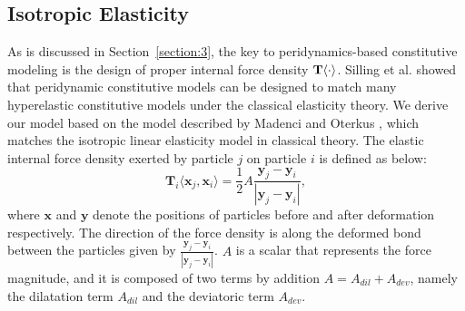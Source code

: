 \subsection{Isotropic Elasticity}\label{section:4.1}

As is discussed in Section~\ref{section:3}, the key to peridynamics-based constitutive modeling is the design of proper internal force density $\nobreak{\mathbf{T}\langle\cdot\rangle}$. Silling et al.\cite{silling2007peridynamic} showed that peridynamic constitutive models can be designed to match many hyperelastic constitutive models under the classical elasticity theory. We derive our model based on the model described by Madenci and Oterkus \cite{madenci2014peridynamic}, which matches the isotropic linear elasticity model in classical theory. The elastic internal force density exerted by particle $j$ on particle $i$ is defined as below:
\begin{equation}
\mathbf{T}_i\langle\mathbf{x}_j,\mathbf{x}_i\rangle = \frac{1}{2}A\frac{\mathbf{y}_j-\mathbf{y}_i}{|\mathbf{y}_j-\mathbf{y}_i|},
\label{eq:2}
\end{equation}
where $\mathbf{x}$ and $\mathbf{y}$ denote the positions of particles before and after deformation respectively. The direction of the force density is along the deformed bond between the particles given by $\frac{\mathbf{y}_j-\mathbf{y}_i}{|\mathbf{y}_j-\mathbf{y}_i|}$. $A$ is a scalar that represents the force magnitude, and it is composed of two terms by addition $A = A_{dil} + A_{dev}$, namely the dilatation term $A_{dil}$ and the deviatoric term $A_{dev}$.

